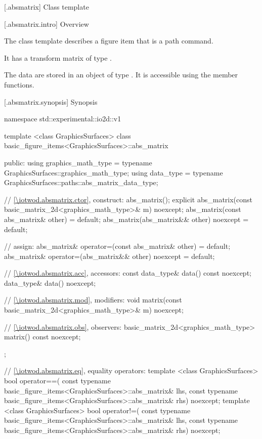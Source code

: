  [\iotwod.absmatrix] {Class template }

 [\iotwod.absmatrix.intro] {Overview}

\pnum
{}%
The class template  describes a figure item that is a path command.

\pnum
It has a transform matrix of type .

\pnum
The data are stored in an object of type . It is accessible using the  member functions.

 [\iotwod.absmatrix.synopsis] {Synopsis}
\begin{codeblock}
namespace std::experimental::io2d::v1 {
  template <class GraphicsSurfaces>
  class basic_figure_items<GraphicsSurfaces>::abs_matrix {
  public:
    using graphics_math_type = typename GraphicsSurfaces::graphics_math_type;
    using data_type =
      typename GraphicsSurfaces::paths::abs_matrix_data_type;

    // \ref{\iotwod.absmatrix.ctor}, construct:
    abs_matrix();
    explicit abs_matrix(const basic_matrix_2d<graphics_math_type>& m) noexcept;
    abs_matrix(const abs_matrix& other) = default;
    abs_matrix(abs_matrix&& other) noexcept = default;

    // assign:
    abs_matrix& operator=(const abs_matrix& other) = default;
    abs_matrix& operator=(abs_matrix&& other) noexcept = default;

    // \ref{\iotwod.absmatrix.acc}, accessors:
    const data_type& data() const noexcept;
    data_type& data() noexcept;

    // \ref{\iotwod.absmatrix.mod}, modifiers:
    void matrix(const basic_matrix_2d<graphics_math_type>& m) noexcept;

    // \ref{\iotwod.absmatrix.obs}, observers:
    basic_matrix_2d<graphics_math_type> matrix() const noexcept;
  };
  
  // \ref{\iotwod.absmatrix.eq}, equality operators:
  template <class GraphicsSurfaces>
  bool operator==(
    const typename basic_figure_items<GraphicsSurfaces>::abs_matrix& lhs,
    const typename basic_figure_items<GraphicsSurfaces>::abs_matrix& rhs) 
    noexcept;  
  template <class GraphicsSurfaces>
  bool operator!=(
    const typename basic_figure_items<GraphicsSurfaces>::abs_matrix& lhs,
    const typename basic_figure_items<GraphicsSurfaces>::abs_matrix& rhs) 
    noexcept;  
}
\end{codeblock}

